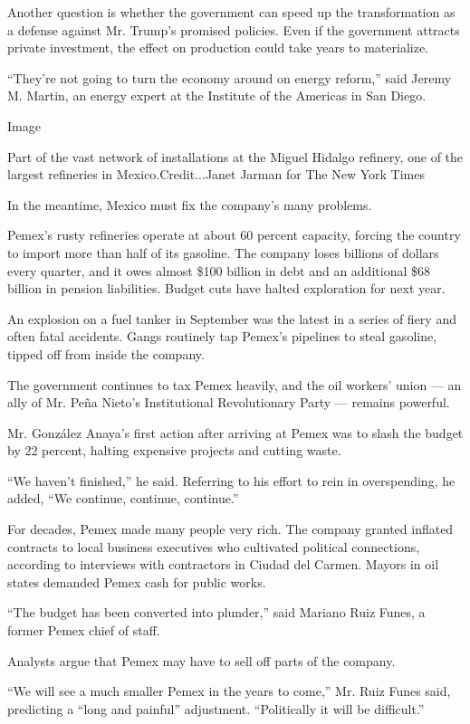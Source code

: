 Another question is whether the government can speed up the
transformation as a defense against Mr. Trump's promised policies. Even
if the government attracts private investment, the effect on production
could take years to materialize.

``They're not going to turn the economy around on energy reform,'' said
Jeremy M. Martin, an energy expert at the Institute of the Americas in
San Diego.

Image

Part of the vast network of installations at the Miguel Hidalgo
refinery, one of the largest refineries in Mexico.Credit...Janet Jarman
for The New York Times

In the meantime, Mexico must fix the company's many problems.

Pemex's rusty refineries operate at about 60 percent capacity, forcing
the country to import more than half of its gasoline. The company loses
billions of dollars every quarter, and it owes almost \$100 billion in
debt and an additional \$68 billion in pension liabilities. Budget cuts
have halted exploration for next year.

An explosion on a fuel tanker in September was the latest in a series of
fiery and often fatal accidents. Gangs routinely tap Pemex's pipelines
to steal gasoline, tipped off from inside the company.

The government continues to tax Pemex heavily, and the oil workers'
union --- an ally of Mr. Peña Nieto's Institutional Revolutionary Party
--- remains powerful.

Mr. González Anaya's first action after arriving at Pemex was to slash
the budget by 22 percent, halting expensive projects and cutting waste.

``We haven't finished,'' he said. Referring to his effort to rein in
overspending, he added, ``We continue, continue, continue.''

For decades, Pemex made many people very rich. The company granted
inflated contracts to local business executives who cultivated political
connections, according to interviews with contractors in Ciudad del
Carmen. Mayors in oil states demanded Pemex cash for public works.

``The budget has been converted into plunder,'' said Mariano Ruiz Funes,
a former Pemex chief of staff.

Analysts argue that Pemex may have to sell off parts of the company.

``We will see a much smaller Pemex in the years to come,'' Mr. Ruiz
Funes said, predicting a ``long and painful'' adjustment. ``Politically
it will be difficult.''

